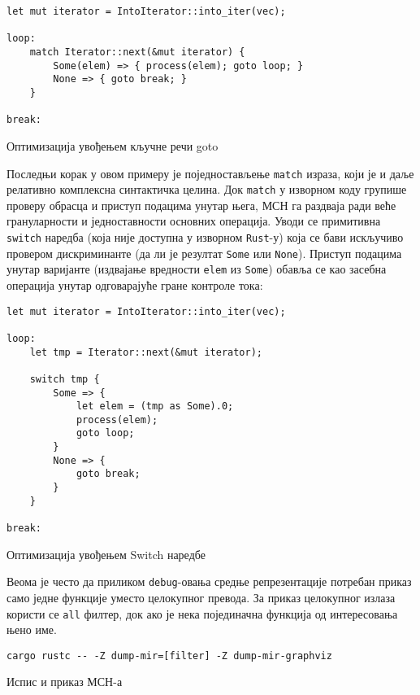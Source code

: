 \begin{listing}[H]
\begin{verbatim}
let mut iterator = IntoIterator::into_iter(vec);

loop: 
    match Iterator::next(&mut iterator) {
        Some(elem) => { process(elem); goto loop; } 
        None => { goto break; } 
    }

break: 
\end{verbatim}
\caption{Оптимизација увођењем кључне речи goto}
\label{lst:optimization-1}
\end{listing}

Последњи корак у овом примеру је поједностављење \verb|match| израза, који је и даље релативно комплексна синтактичка целина. 
Док \verb|match| у изворном коду групише проверу обрасца и приступ подацима унутар њега, 
МСН га раздваја ради веће грануларности и једноставности основних операција. 
Уводи се примитивна \verb|switch| наредба (која није доступна у изворном \verb|Rust|-у) која се бави искључиво провером дискриминанте 
(да ли је резултат \verb|Some| или \verb|None|). Приступ подацима унутар варијанте 
(издвајање вредности \verb|elem| из \verb|Some|) обавља се као засебна операција унутар одговарајуће гране контроле тока:

\begin{listing}[H]
\begin{verbatim}
let mut iterator = IntoIterator::into_iter(vec);

loop:
    let tmp = Iterator::next(&mut iterator); 
    
    switch tmp { 
        Some => { 
            let elem = (tmp as Some).0; 
            process(elem); 
            goto loop; 
        }
        None => { 
            goto break; 
        }
    }
    
break:
\end{verbatim}
\caption{Оптимизација увођењем Switch наредбе}
\label{lst:optimization-2}
\end{listing}


Веома је често да приликом \verb|debug|-овања средње репрезентације потребан приказ само једне функције
уместо целокупног превода. За приказ целокупног излаза користи се \verb|all| филтер, док ако је нека појединачна функција од интересовања
њено име.

\begin{listing}[H]
\begin{verbatim}
cargo rustc -- -Z dump-mir=[filter] -Z dump-mir-graphviz
\end{verbatim}
\caption{Испис и приказ МСН-а}
\label{lst:mir_print}
\end{listing}

